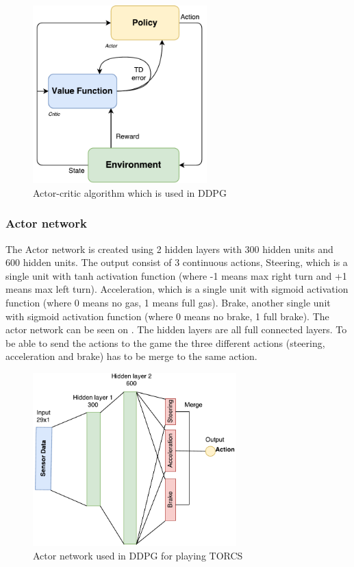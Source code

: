 \begin{figure}[H]
	\centering
	\includegraphics[width=0.6\textwidth]{Figures/Architecture/DDPG/Actor_critic_architecture.pdf}
	\caption{Actor-critic algorithm which is used in DDPG}
	\label{fig:Actor_critic_architecture}
\end{figure}

\subsubsection{Actor network}
The Actor network is created using  2 hidden layers with 300 hidden units and 600 hidden units. The output consist of 3 continuous actions, Steering, which is a single unit with tanh activation function (where -1 means max right turn and +1 means max left turn). Acceleration, which is a single unit with sigmoid activation function (where 0 means no gas, 1 means full gas). Brake, another single unit with sigmoid activation function (where 0 means no brake, 1 full brake). The actor network can be seen on . The hidden layers are all full connected layers. To be able to send the actions to the game the three different actions (steering, acceleration and brake) has to be merge to the same action. 

\begin{figure}[H]
	\centering
	\includegraphics[width=0.7\textwidth]{Figures/Architecture/DDPG/DDPG_Actor_network.pdf}
	\caption{Actor network used in DDPG for playing TORCS }
	\label{fig:DDPG_Actor_network}
\end{figure}  


